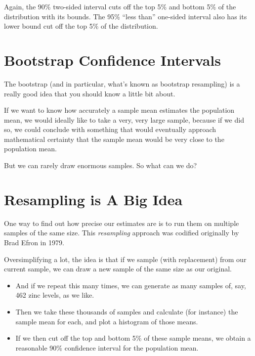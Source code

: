 \documentclass[
]{book}
\providecommand{\tightlist}{%
  \setlength{\itemsep}{0pt}\setlength{\parskip}{0pt}}
\begin{document}
Again, the 90\% two-sided interval cuts off the top 5\% and bottom 5\% of the distribution with its bounds. The 95\% ``less than'' one-sided interval also has its lower bound cut off the top 5\% of the distribution.

\hypertarget{bootstrap-confidence-intervals}{%
\section{Bootstrap Confidence Intervals}\label{bootstrap-confidence-intervals}}

The bootstrap (and in particular, what's known as bootstrap resampling) is a really good idea that you should know a little bit about.

If we want to know how accurately a sample mean estimates the population mean, we would ideally like to take a very, very large sample, because if we did so, we could conclude with something that would eventually approach mathematical certainty that the sample mean would be very close to the population mean.

But we can rarely draw enormous samples. So what can we do?

\hypertarget{resampling-is-a-big-idea}{%
\section{Resampling is A Big Idea}\label{resampling-is-a-big-idea}}

One way to find out how precise our estimates are is to run them on multiple samples of the same size. This \emph{resampling} approach was codified originally by Brad Efron in 1979.

Oversimplifying a lot, the idea is that if we sample (with replacement) from our current sample, we can draw a new sample of the same size as our original.

\begin{itemize}
\tightlist
\item
  And if we repeat this many times, we can generate as many samples of, say, 462 zinc levels, as we like.
\item
  Then we take these thousands of samples and calculate (for instance) the sample mean for each, and plot a histogram of those means.
\item
  If we then cut off the top and bottom 5\% of these sample means, we obtain a reasonable 90\% confidence interval for the population mean.
\end{itemize}
\end{document}
